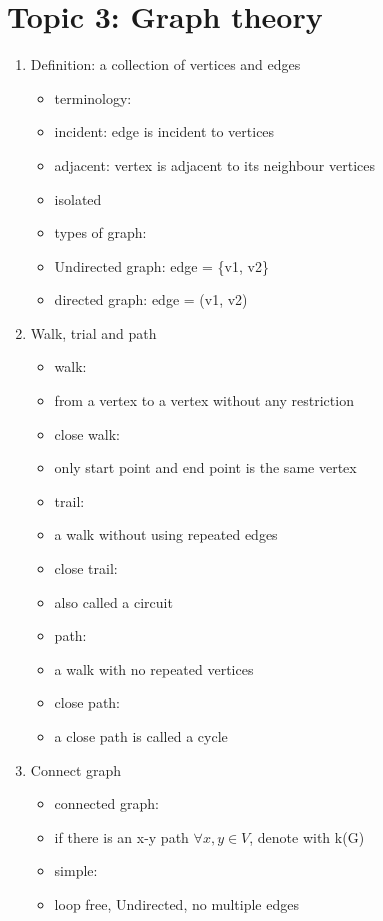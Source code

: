 \documentclass[11pt, a4paper]{article}
\begin{document}
\section*{Topic 3: Graph theory}
    \begin{enumerate}
        \item Definition: a collection of vertices and edges
            \begin{itemize}
                \item terminology:
                \item incident: edge is incident to vertices
                \item adjacent: vertex is adjacent to its neighbour vertices
                \item isolated
                \item types of graph:
                \item Undirected graph: edge = \{v1, v2\}
                \item directed graph: edge = (v1, v2)
            \end{itemize}
        \item Walk, trial and path
            \begin{itemize}
                \item walk:
                \item from a vertex to a vertex without any restriction
                \item close walk:
                \item only start point and end point is the same vertex
                \item trail:
                \item a walk without using repeated edges
                \item close trail:
                \item also called a circuit
                \item path:
                \item a walk with no repeated vertices
                \item close path:
                \item a close path is called a cycle
            \end{itemize}
        \item Connect graph
            \begin{itemize}
                \item connected graph:
                \item if there is an x-y path $\forall x,y \in V$, denote with k(G)
                \item simple:
                \item loop free, Undirected, no multiple edges
            \end{itemize}
    \end{enumerate}
\end{document}
